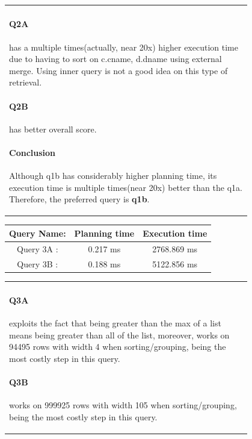 \documentclass[10pt]{article}
\begin{document}
\begin{enumerate}
\begin{figure}[H]
\begin{minipage}[b]{0.55\linewidth}
\begin{tabular}{p{0.95\linewidth}}
						\paragraph{Q2A}has a multiple times(actually, near 20x) higher execution time due to having to sort on c.cname, d.dname using external merge. Using inner query is not a good idea on this type of retrieval.
						\paragraph{Q2B} has better overall score.
						\paragraph{Conclusion} Although q1b has considerably higher planning time, its execution time is multiple times(near 20x) better than the q1a. Therefore, the preferred query is \textbf{q1b}.
					\end{tabular}
				\end{minipage}
			\end{figure}
			
			\begin{figure}[H]
				\begin{minipage}[]{0.45\linewidth}
					\begin{tabular}[t]{|c|c|c|}
						\hline
						Query Name: & Planning time & Execution time \\
						\hline
						Query 3A :  &  0.217 ms		& 2768.869 ms\\ 
						Query 3B :  &  	0.188 ms	& 5122.856 ms\\
						\hline
					\end{tabular}
				\end{minipage}
				\hspace{0.1cm}
				\begin{minipage}[b]{0.55\linewidth}
					\begin{tabular}{p{0.95\linewidth}}
						\paragraph{Q3A} exploits the fact that being greater than the max of a list means being greater than all of the list, moreover, works on 94495 rows with width 4 when sorting/grouping, being the most costly step in this query.
						\paragraph{Q3B} works on 999925 rows with width 105 when sorting/grouping, being the most costly step in this query.

\end{tabular}
\end{minipage}
\end{figure}
\end{enumerate}
\end{document}
